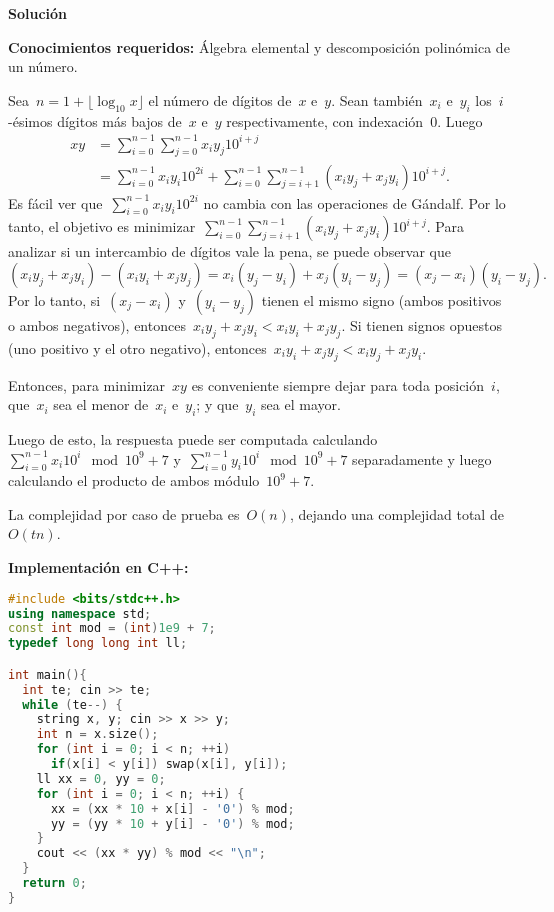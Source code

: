 \vspace*{0cm}
{\Large\textbf{Solución}}

\textbf{Conocimientos requeridos:} Álgebra elemental y descomposición polinómica de un número.

Sea~$n = 1 + \lfloor \log_{10} x \rfloor$ el número de dígitos de~$x$ e~$y$. Sean
también~$x_i$ e~$y_i$ los~$i$-ésimos dígitos más bajos de~$x$ e~$y$ respectivamente,
con indexación~$0$. Luego
\begin{align*}
  xy &= \sum_{i = 0}^{n-1} \sum_{j = 0}^{n-1}x_iy_j 10^{i + j} \\
     &= \sum_{i = 0}^{n-1}x_iy_i 10^{2i} + \sum_{i = 0}^{n-1} \sum_{j = i + 1}^{n -
       1} \left(x_iy_j + x_jy_i\right) 10^{i + j}.
\end{align*}
Es fácil ver que~$\sum_{i = 0}^{n-1}x_iy_i 10^{2i}$ no cambia con las operaciones de
Gándalf. Por lo tanto, el objetivo es
minimizar~$\sum_{i = 0}^{n-1} \sum_{j = i + 1}^{n - 1} \left(x_iy_j + x_jy_i\right)
10^{i + j}$. Para analizar si un intercambio de dígitos vale la pena, se puede
observar que
\begin{equation*}
  \left(x_iy_j + x_jy_i\right) - \left(x_iy_i + x_jy_j\right) = x_i\left(y_j - y_i\right) + x_j\left(y_i - y_j\right) = \left(x_j
    - x_i\right) \left(y_i - y_j\right).
\end{equation*}
Por lo tanto, si~$(x_j - x_i)$ y~$(y_i - y_j)$ tienen el mismo signo (ambos positivos
o ambos negativos), entonces~$x_iy_j + x_jy_i < x_iy_i + x_jy_j$. Si tienen signos
opuestos (uno positivo y el otro negativo),
entonces~$x_iy_i + x_jy_j < x_iy_j + x_jy_i$.

Entonces, para minimizar~$xy$ es conveniente siempre dejar para toda posición~$i$,
que~$x_i$ sea el menor de~$x_i$ e~$y_i$; y que~$y_i$ sea el mayor.

Luego de esto, la respuesta puede ser computada
calculando~$\sum_{i=0}^{n-1}x_i10^{i} \mod 10^9 + 7$
y~$\sum_{i=0}^{n-1}y_i10^{i} \mod 10^9 + 7$ separadamente y luego calculando el
producto de ambos módulo~$10^9 + 7$.

La complejidad por caso de prueba es~$O(n)$, dejando una complejidad total
de~$O(tn)$.

\textbf{Implementación en C++:}

\begin{lstlisting}[language=C++]
#include <bits/stdc++.h>
using namespace std;
const int mod = (int)1e9 + 7;
typedef long long int ll;

int main(){
  int te; cin >> te;
  while (te--) {
    string x, y; cin >> x >> y;
    int n = x.size();
    for (int i = 0; i < n; ++i)
      if(x[i] < y[i]) swap(x[i], y[i]);
    ll xx = 0, yy = 0;
    for (int i = 0; i < n; ++i) {
      xx = (xx * 10 + x[i] - '0') % mod;
      yy = (yy * 10 + y[i] - '0') % mod;
    }
    cout << (xx * yy) % mod << "\n";
  }
  return 0;
}
\end{lstlisting}

\newpage

